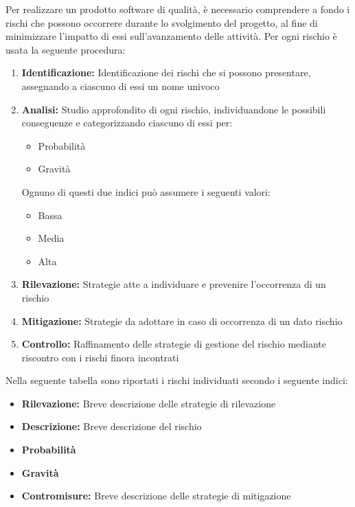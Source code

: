 Per realizzare un prodotto software di qualità, è necessario
comprendere a fondo i rischi che possono occorrere durante lo svolgimento
del progetto, al fine di minimizzare l'impatto di essi sull'avanzamento
delle attività. \newline
Per ogni rischio è usata la seguente procedura:
\begin{enumerate}
    \item \textbf{Identificazione: }
           Identificazione dei rischi che si possono presentare, assegnando a ciascuno di essi un nome univoco
    \item \textbf{Analisi: } Studio approfondito di ogni rischio, individuandone le possibili conseguenze e categorizzando ciascuno di essi per:
           \begin{itemize}
               \item Probabilità
               \item Gravità
           \end{itemize}
           Ognuno di questi due indici può assumere i seguenti valori:
           \begin{itemize}
               \item Bassa
               \item Media
               \item Alta
           \end{itemize}
    \item \textbf{Rilevazione: }Strategie atte a individuare e prevenire l'occorrenza di un rischio
    \item \textbf{Mitigazione: }Strategie da adottare in caso di occorrenza di un dato rischio
    \item \textbf{Controllo: }Raffinamento delle strategie di gestione del rischio mediante riscontro con i rischi
                              finora incontrati
\end{enumerate}                         
Nella seguente tabella sono riportati i rischi individuati secondo i seguente indici:
\begin{itemize}
	\item \textbf{Rilevazione: }Breve descrizione delle strategie di rilevazione
	\item \textbf{Descrizione: }Breve descrizione del rischio  
	\item \textbf{Probabilità }
    \item \textbf{Gravità }
    \item \textbf{Contromisure: }Breve descrizione delle strategie di mitigazione  

\end{itemize}


